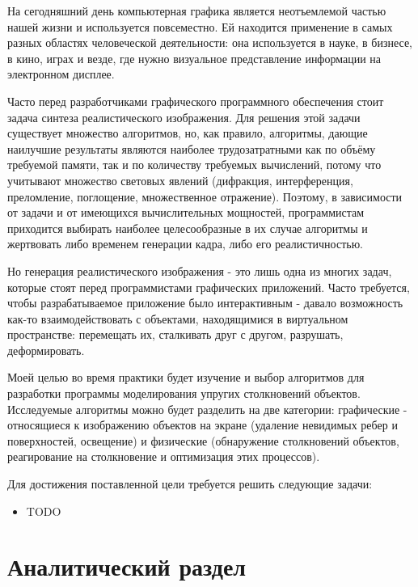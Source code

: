 \fontsize{14pt}{14pt}\selectfont


На сегодняшний день компьютерная графика является неотъемлемой частью
нашей жизни и используется повсеместно. Ей находится применение в самых разных
областях человеческой деятельности: она используется в науке, в бизнесе, в
кино, играх и везде, где нужно визуальное представление информации на
электронном дисплее.

Часто перед разработчиками графического программного обеспечения
стоит задача синтеза реалистического изображения. Для решения этой задачи
существует множество алгоритмов, но, как правило, алгоритмы, дающие наилучшие
результаты являются наиболее трудозатратными как по объёму требуемой памяти,
так и по количеству требуемых вычислений, потому что учитывают множество
световых явлений (дифракция, интерференция, преломление, поглощение,
множественное отражение). Поэтому, в зависимости от задачи и от имеющихся
вычислительных мощностей, программистам приходится выбирать наиболее
целесообразные в их случае алгоритмы и жертвовать либо временем генерации
кадра, либо его реалистичностью.

Но генерация реалистического изображения - это лишь одна из многих
задач, которые стоят перед программистами графических приложений. Часто
требуется, чтобы разрабатываемое приложение было интерактивным - давало
возможность как-то взаимодействовать с объектами, находящимися в виртуальном
пространстве: перемещать их, сталкивать друг с другом, разрушать,
деформировать.

Моей целью во время практики будет изучение и выбор алгоритмов для
разработки программы моделирования упругих столкновений объектов. Исследуемые
алгоритмы можно будет разделить на две категории: графические - относящиеся к
изображению объектов на экране (удаление невидимых ребер и поверхностей,
освещение) и физические (обнаружение столкновений объектов, реагирование на
столкновение и оптимизация этих процессов). %

Для достижения поставленной цели требуется решить следующие задачи:

\begin{itemize}
    \item TODO
\end{itemize}
\newpage
\section{Аналитический раздел}

